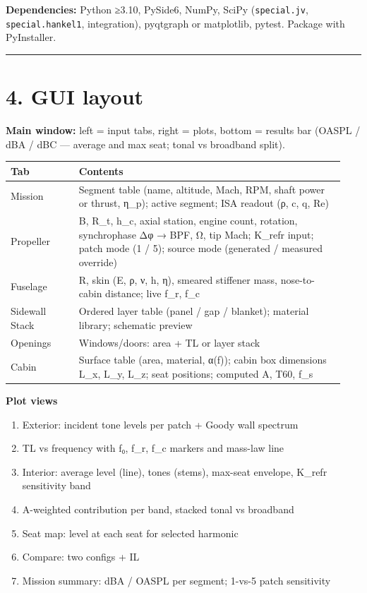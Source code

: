 \documentclass[10pt,a4paper]{article}
\begin{document}
\textbf{Dependencies:} Python ≥3.10, PySide6, NumPy, SciPy (\texttt{special.\allowbreak{}jv}, \texttt{special.\allowbreak{}hankel1}, integration), pyqtgraph or matplotlib, pytest. Package with PyInstaller.

\noindent\rule{\linewidth}{0.4pt}

\section*{4. GUI layout}

\textbf{Main window:} left = input tabs, right = plots, bottom = results bar (OASPL / dBA / dBC — average and max seat; tonal vs broadband split).

{\small
\begin{longtable}{>{\raggedright\arraybackslash}p{0.192\linewidth}>{\raggedright\arraybackslash}p{0.748\linewidth}}
\hline
\textbf{Tab} & \textbf{Contents} \\
\hline
\endhead
Mission & Segment table (name, altitude, Mach, RPM, shaft power or thrust, η\_p); active segment; ISA readout (ρ, c, q, Re) \\
Propeller & B, R\_t, h\_c, axial station, engine count, rotation, synchrophase Δφ → BPF, Ω, tip Mach; K\_refr input; patch mode (1 / 5); source mode (generated / measured override) \\
Fuselage & R, skin (E, ρ, ν, h, η), smeared stiffener mass, nose-to-cabin distance; live f\_r, f\_c \\
Sidewall Stack & Ordered layer table (panel / gap / blanket); material library; schematic preview \\
Openings & Windows/doors: area + TL or layer stack \\
Cabin & Surface table (area, material, α(f)); cabin box dimensions L\_x, L\_y, L\_z; seat positions; computed A, T60, f\_s \\
\hline
\end{longtable}}

\textbf{Plot views}

\begin{enumerate}
\item Exterior: incident tone levels per patch + Goody wall spectrum
\item TL vs frequency with f₀, f\_r, f\_c markers and mass-law line
\item Interior: average level (line), tones (stems), max-seat envelope, K\_refr sensitivity band
\item A-weighted contribution per band, stacked tonal vs broadband
\item Seat map: level at each seat for selected harmonic
\item Compare: two configs + IL
\item Mission summary: dBA / OASPL per segment; 1-vs-5 patch sensitivity
\end{enumerate}
\end{document}
